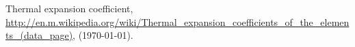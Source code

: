 \documentclass[a4paper]{article}
\begin{document}
\begin{thebibliography}{99}
%	
%
		
%
%
%	
 Thermal expansion coefficient, \url{http://en.m.wikipedia.org/wiki/Thermal_expansion_coefficients_of_the_elements_(data_page)}, (\today).
\end{thebibliography}
\end{document}
